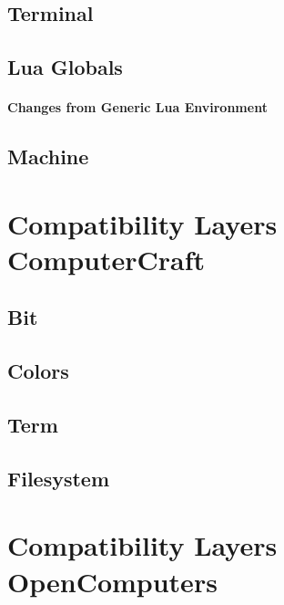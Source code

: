 \documentclass[10pt, stock, openany]{memoir}
\let\oldsection\chapter
\renewcommand\chapter{\clearpage\oldsection}
\begin{document}
\chapter{Terminal}


\chapter{Lua Globals}

\subsection{Changes from Generic Lua Environment}


\chapter{Machine}



\part[Compatibility Layers---ComputerCraft]{{\LARGE Compatibility Layers} \\ ComputerCraft}

\chapter{Bit}


\chapter{Colors}


\chapter{Term}

\chapter{Filesystem}



\part[Compatibility Layers---OpenComputers]{{\LARGE Compatibility Layers} \\ OpenComputers}
\end{document}
